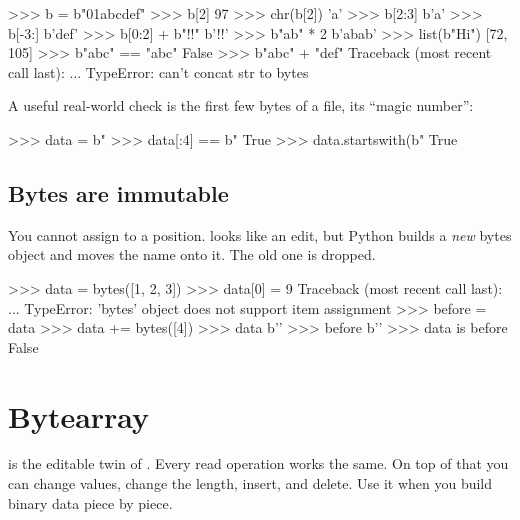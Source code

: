 \begin{pycode}
>>> b = b"\xff\x01abcdef"
>>> b[2]
97
>>> chr(b[2])
'a'
>>> b[2:3]
b'a'
>>> b[-3:]
b'def'
>>> b[0:2] + b"!!"
b'\xff{}!!'
>>> b"ab" * 2
b'abab'
>>> list(b"Hi")
[72, 105]
>>> b"abc" == "abc"
False
>>> b"abc" + "def"
Traceback (most recent call last):
  ...
TypeError: can't concat str to bytes
\end{pycode}

A useful real-world check is the first few bytes of a file, its ``magic number'':

\begin{pycode}
>>> data = b"%
>>> data[:4] == b"%
True
>>> data.startswith(b"%
True
\end{pycode}

\subsection{Bytes are immutable}

You cannot assign to a position.  looks like an edit, but Python builds a \emph{new} bytes
object and moves the name  onto it. The old one is dropped.

\begin{pycode}
>>> data = bytes([1, 2, 3])
>>> data[0] = 9
Traceback (most recent call last):
  ...
TypeError: 'bytes' object does not support item assignment
>>> before = data
>>> data += bytes([4])
>>> data
b''
>>> before
b''
>>> data is before
False
\end{pycode}

\section{Bytearray}

 is the editable twin of . Every read operation works the same. On top of
that you can change values, change the length, insert, and delete. Use it when you build binary data
piece by piece.

